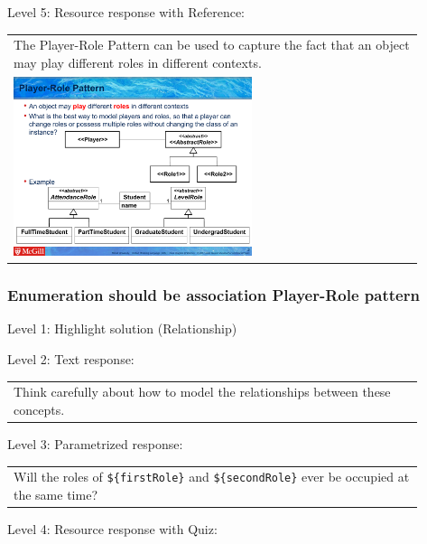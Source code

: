 \noindent Level 5: Resource response with Reference: \medskip

\begin{tabular}{|p{0.9\linewidth}}
The Player-Role Pattern can be used to capture the fact that an object may play different roles
in different contexts.

\\
\includegraphics[width=0.6\textwidth]{images/player_role.png}
\end{tabular} \medskip


\subsubsection{Enumeration should be association Player-Role pattern}

\noindent Level 1: Highlight solution (Relationship) \medskip

\noindent Level 2: Text response: \medskip

\begin{tabular}{|p{0.9\linewidth}}
Think carefully about how to model the relationships between these concepts.
\end{tabular} \medskip

\noindent Level 3: Parametrized response: \medskip

\begin{tabular}{|p{0.9\linewidth}}
Will the roles of \verb|${firstRole}| and \verb|${secondRole}| ever be occupied at the same time?
\end{tabular} \medskip

\noindent Level 4: Resource response with Quiz: \medskip


